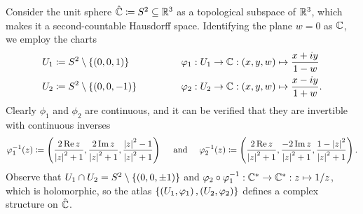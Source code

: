 \begin{example}
    Consider the unit sphere $\hat{\mathbb{C}}\coloneqq S^2\subseteq\mathbb{R}^3$ as a topological subspace of $\mathbb{R}^3$, which makes it a second-countable Hausdorff space. Identifying the plane $w=0$ as $\mathbb{C}$, we employ the charts
    \begin{equation*}
        \begin{alignedat}{2}
            U_1&\coloneqq S^2\comp\l\{\l(0,0,1\r)\r\}\ \ \ \ \ \ \ \ \ \ \ \ \ \ \ \ &&\phi_1:U_1\to\C:\tpl{x,y,w}\mapsto\frac{x+iy}{1-w} \\
            U_2&\coloneqq S^2\comp\l\{\l(0,0,-1\r)\r\}&&\phi_2:U_2\to\C:\tpl{x,y,w}\mapsto\frac{x-iy}{1+w}.
        \end{alignedat}
    \end{equation*}
    Clearly $\phi_1$ and $\phi_2$ are continuous, and it can be verified that they are invertible with continuous inverses
    \begin{equation*}
        \phi_1^{-1}\!\l(z\r)\coloneqq\tpl{\frac{2\Re z}{\l|z\r|^2+1},\frac{2\Im z}{\l|z\r|^2+1},\frac{\l|z\r|^2-1}{\l|z\r|^2+1}}\ \ \ \ \textrm{and}\ \ \ \ \phi_2^{-1}\!\l(z\r)\coloneqq\tpl{\frac{2\Re z}{\l|z\r|^2+1},\frac{-2\Im z}{\l|z\r|^2+1},\frac{1-\l|z\r|^2}{\l|z\r|^2+1}}.
    \end{equation*}
    Observe that $U_1\cap U_2=S^2\setminus\left\{\left(0,0,\pm1\right)\right\}$ and $\varphi_2\circ\varphi_1^{-1}:\mathbb{C}^\ast\to\mathbb{C}^\ast:z\mapsto1/z$, which is holomorphic, so the atlas $\left\{\left(U_1,\varphi_1\right),\left(U_2,\varphi_2\right)\right\}$ defines a complex structure on $\hat{\mathbb{C}}$.\exqed
\end{example}
